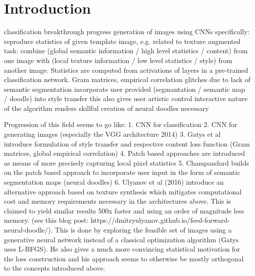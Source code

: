 
\section{Introduction}
\label{section:introduction}


classification breakthrough progress
generation of images using CNNs
specifically: reproduce statistics of given template image, e.g. related to texture
augmented task: combine 
	(global semantic information / high level statistics / content) from one image with 
	(local texture information / low level statistics / style) from another image.
Statistics are computed from activations of layers in a pre-trained classification network. Gram matrices, empirical correlation
glitches due to lack of semantic segmentation 
incorporate user provided (segmantation / semantic map / doodle) into style transfer
this also gives user artistic control
interactive nature of the algorithm renders skillful creation of neural doodles necessary

Progression of this field seems to go like:
1. CNN for classification
2. CNN for generating images (especially the VGG architecture 2014)
3. Gatys et al introduce formulation of style transfer and respective content loss function (Gram matrices, global empirical correlation)
4. Patch based approaches are introduced as means of more precisely capturing local pixel statistics
5. Champandard builds on the patch based approach to incorporate user input in the form of semantic segmentation maps (neural doodles) 
6. Ulyanov et al (2016) introduce an alternative approach based on texture synthesis which mitigates computational cost and memory requirements necessary in the architectures above. This is claimed to yield similar results 500x faster and using an order of magnitude less memory. (see this blog post: https://dmitryulyanov.github.io/feed-forward-neural-doodle/). This is done by exploring the feasible set of images using a generative neural network instead of a classical optimization algorithm (Gatys uses L-BFGS). He also gives a much more convincing statistical motivation for the loss construction and his approach seems to otherwise be mostly orthogonal to the concepts introduced above.